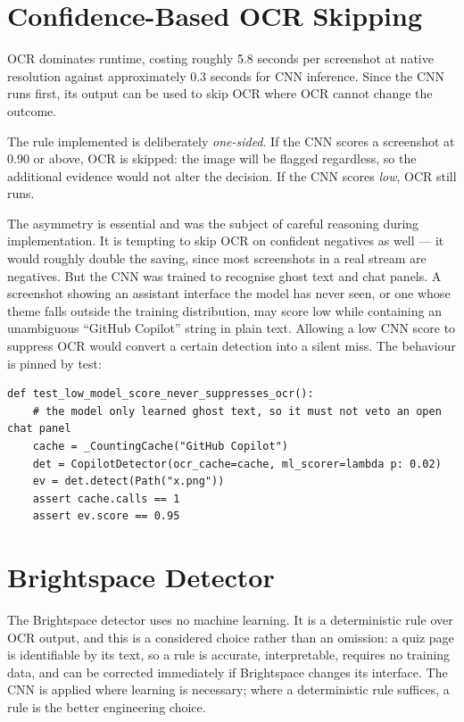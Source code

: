 \documentclass[12pt,oneside]{report}
\begin{document}
\section{Confidence-Based OCR Skipping}
\label{sec:skiplogic}

OCR dominates runtime, costing roughly 5.8 seconds per screenshot at native
resolution against approximately 0.3 seconds for CNN inference. Since the CNN
runs first, its output can be used to skip OCR where OCR cannot change the
outcome.

The rule implemented is deliberately \emph{one-sided}. If the CNN scores a
screenshot at 0.90 or above, OCR is skipped: the image will be flagged
regardless, so the additional evidence would not alter the decision. If the CNN
scores \emph{low}, OCR still runs.

The asymmetry is essential and was the subject of careful reasoning during
implementation. It is tempting to skip OCR on confident negatives as well ---
it would roughly double the saving, since most screenshots in a real stream are
negatives. But the CNN was trained to recognise ghost text and chat panels. A
screenshot showing an assistant interface the model has never seen, or one
whose theme falls outside the training distribution, may score low while
containing an unambiguous ``GitHub Copilot'' string in plain text. Allowing a
low CNN score to suppress OCR would convert a certain detection into a silent
miss. The behaviour is pinned by test:

\begin{lstlisting}[caption={The model must never be able to veto a keyword detection.}]
def test_low_model_score_never_suppresses_ocr():
    # the model only learned ghost text, so it must not veto an open chat panel
    cache = _CountingCache("GitHub Copilot")
    det = CopilotDetector(ocr_cache=cache, ml_scorer=lambda p: 0.02)
    ev = det.detect(Path("x.png"))
    assert cache.calls == 1
    assert ev.score == 0.95
\end{lstlisting}

\section{Brightspace Detector}
\label{sec:brightspacedetector}

The Brightspace detector uses no machine learning. It is a deterministic rule
over OCR output, and this is a considered choice rather than an omission: a
quiz page is identifiable by its text, so a rule is accurate, interpretable,
requires no training data, and can be corrected immediately if Brightspace
changes its interface. The CNN is applied where learning is necessary; where a
deterministic rule suffices, a rule is the better engineering choice.
\end{document}
